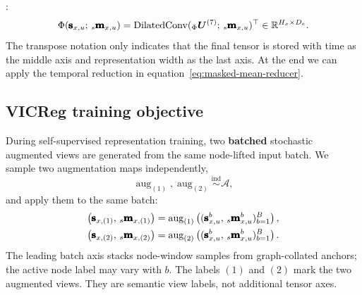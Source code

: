 :
\[
  \Phi(\pmb{\mathbf{s}}_{x,u};\,{}_{s}\pmb{\mathbf{m}}_{x,u})
  =
  \operatorname{DilatedConv}
  ({}_{\Phi}\bm{U}^{(7)};\,{}_{s}\pmb{\mathbf{m}}_{x,u})^{\top}
  \in
  \mathbb{R}^{H_x \times D_e}.
\]
The transpose notation only indicates that the final tensor is stored with time
as the middle axis and representation width as the last axis. At the end we can 
apply the temporal reduction in equation~\eqref{eq:masked-mean-reducer}.
























\subsection{VICReg training objective}
\label{subsec:vicreg-training-objective}

During self-supervised representation training, two \textbf{batched}
stochastic augmented views%
are generated from the same node-lifted input batch.  We sample two
augmentation maps independently,
\[
  \operatorname{aug}_{(1)},\operatorname{aug}_{(2)}
  \overset{\mathrm{ind}}{\sim}
  \mathcal{A},
\]
and apply them to the same batch:
\[
	  \begin{aligned}
	    \left(
	      \pmb{\mathbf{s}}_{x,(1)},\,{}_{s}\pmb{\mathbf{m}}_{x,(1)}
	    \right)
	    &=
	    \operatorname{aug}_{(1)}
	    \left(
	      (\pmb{\mathbf{s}}_{x,u}^{b},\,{}_{s}\pmb{\mathbf{m}}_{x,u}^{b})_{b=1}^{B}
	    \right),
	    \\
	    \left(
	      \pmb{\mathbf{s}}_{x,(2)},\,{}_{s}\pmb{\mathbf{m}}_{x,(2)}
	    \right)
	    &=
	    \operatorname{aug}_{(2)}
	    \left(
	      (\pmb{\mathbf{s}}_{x,u}^{b},\,{}_{s}\pmb{\mathbf{m}}_{x,u}^{b})_{b=1}^{B}
	    \right).
	  \end{aligned}
\]
The leading batch axis stacks node-window samples from graph-collated anchors;
the active node label may vary with $b$.
The labels $(1)$ and $(2)$ mark the two augmented views.  They are semantic view
labels, not additional tensor axes.

